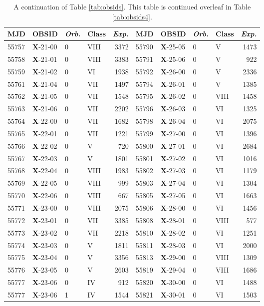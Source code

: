 \begin{table*}
\caption[]{A continuation of Table \ref{tab:obsids}.  This table is continued overleaf in Table \ref{tab:obsids4}.}
\label{tab:obsids3}
\begin{tabular}{llllrllllr}
\hline
\hline
MJD&OBSID&\textit{Orb.}&Class&\textit{Exp.}&MJD&OBSID&\textit{Orb.}&Class&\textit{Exp.}\\
\hline
55757&\textbf{X}-21-00&0&VIII&3372&55790&\textbf{X}-25-05&0&V&1473\\
55758&\textbf{X}-21-01&0&VIII&3383&55791&\textbf{X}-25-06&0&V&922\\
55759&\textbf{X}-21-02&0&VI&1938&55792&\textbf{X}-26-00&0&V&2336\\
55761&\textbf{X}-21-04&0&VII&1497&55794&\textbf{X}-26-01&0&V&1385\\
55762&\textbf{X}-21-05&0&VII&1548&55795&\textbf{X}-26-02&0&VIII&1458\\
55763&\textbf{X}-21-06&0&VII&2202&55796&\textbf{X}-26-03&0&VI&1325\\
55764&\textbf{X}-22-00&0&VII&1682&55798&\textbf{X}-26-04&0&VI&2075\\
55765&\textbf{X}-22-01&0&VII&1221&55799&\textbf{X}-27-00&0&VI&1396\\
55766&\textbf{X}-22-02&0&V&720&55800&\textbf{X}-27-01&0&VI&2684\\
55767&\textbf{X}-22-03&0&V&1801&55801&\textbf{X}-27-02&0&VI&1016\\
55768&\textbf{X}-22-04&0&VIII&1983&55802&\textbf{X}-27-03&0&VI&1179\\
55769&\textbf{X}-22-05&0&VIII&999&55803&\textbf{X}-27-04&0&VI&1304\\
55770&\textbf{X}-22-06&0&VIII&667&55805&\textbf{X}-27-05&0&VI&1663\\
55771&\textbf{X}-23-00&0&VIII&2075&55806&\textbf{X}-28-00&0&VI&1456\\
55772&\textbf{X}-23-01&0&VII&3385&55808&\textbf{X}-28-01&0&VIII&577\\
55773&\textbf{X}-23-02&0&VII&2218&55810&\textbf{X}-28-02&0&VI&1251\\
55774&\textbf{X}-23-03&0&V&1811&55811&\textbf{X}-28-03&0&VI&2000\\
55775&\textbf{X}-23-04&0&V&3356&55813&\textbf{X}-29-00&0&VIII&1309\\
55776&\textbf{X}-23-05&0&V&2603&55819&\textbf{X}-29-04&0&VIII&1686\\
55777&\textbf{X}-23-06&0&IV&912&55820&\textbf{X}-30-00&0&VI&1488\\
55777&\textbf{X}-23-06&1&IV&1544&55821&\textbf{X}-30-01&0&VI&1503\\

\end{tabular}
\end{table*}
